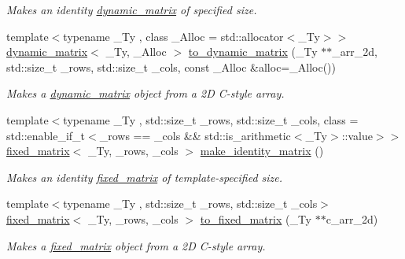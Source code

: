 \begin{DoxyCompactItemize}
\begin{DoxyCompactList}\small\item\em Makes an identity {\ttfamily \hyperlink{classcrsc_1_1dynamic__matrix}{dynamic\+\_\+matrix}} of specified size. \end{DoxyCompactList}\item 
{\footnotesize template$<$typename \+\_\+\+Ty , class \+\_\+\+Alloc  = std\+::allocator$<$\+\_\+\+Ty$>$$>$ }\\\hyperlink{classcrsc_1_1dynamic__matrix}{dynamic\+\_\+matrix}$<$ \+\_\+\+Ty, \+\_\+\+Alloc $>$ \hyperlink{namespacecrsc_a875c42e79922e6c7f03172d730615236}{to\+\_\+dynamic\+\_\+matrix} (\+\_\+\+Ty $\ast$$\ast$\+\_\+arr\+\_\+2d, std\+::size\+\_\+t \+\_\+rows, std\+::size\+\_\+t \+\_\+cols, const \+\_\+\+Alloc \&alloc=\+\_\+\+Alloc())
\begin{DoxyCompactList}\small\item\em Makes a {\ttfamily \hyperlink{classcrsc_1_1dynamic__matrix}{dynamic\+\_\+matrix}} object from a 2D C-\/style array. \end{DoxyCompactList}\item 
{\footnotesize template$<$typename \+\_\+\+Ty , std\+::size\+\_\+t \+\_\+rows, std\+::size\+\_\+t \+\_\+cols, class  = std\+::enable\+\_\+if\+\_\+t$<$\+\_\+rows == \+\_\+cols			\&\& std\+::is\+\_\+arithmetic$<$\+\_\+\+Ty$>$\+::value$>$$>$ }\\\hyperlink{classcrsc_1_1fixed__matrix}{fixed\+\_\+matrix}$<$ \+\_\+\+Ty, \+\_\+rows, \+\_\+cols $>$ \hyperlink{namespacecrsc_a48b1c015ab9b7c0aa39ba6d10afdad59}{make\+\_\+identity\+\_\+matrix} ()
\begin{DoxyCompactList}\small\item\em Makes an identity {\ttfamily \hyperlink{classcrsc_1_1fixed__matrix}{fixed\+\_\+matrix}} of template-\/specified size. \end{DoxyCompactList}\item 
{\footnotesize template$<$typename \+\_\+\+Ty , std\+::size\+\_\+t \+\_\+rows, std\+::size\+\_\+t \+\_\+cols$>$ }\\\hyperlink{classcrsc_1_1fixed__matrix}{fixed\+\_\+matrix}$<$ \+\_\+\+Ty, \+\_\+rows, \+\_\+cols $>$ \hyperlink{namespacecrsc_a5abee717fbb3202f618ee9d7d4e71fb6}{to\+\_\+fixed\+\_\+matrix} (\+\_\+\+Ty $\ast$$\ast$c\+\_\+arr\+\_\+2d)
\begin{DoxyCompactList}\small\item\em Makes a {\ttfamily \hyperlink{classcrsc_1_1fixed__matrix}{fixed\+\_\+matrix}} object from a 2D C-\/style array. \end{DoxyCompactList}\item 

\end{DoxyCompactItemize}
